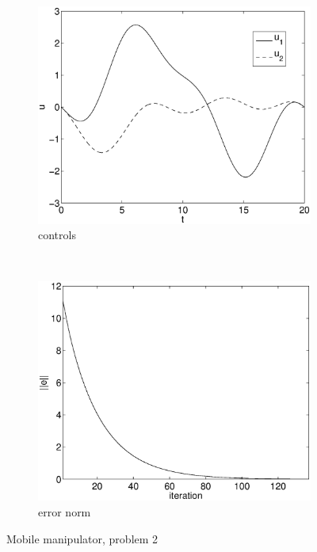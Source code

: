 \begin{figure}[h]
\begin{subfigure}[b]{0.45\textwidth}
\centering
\includegraphics[width=\textwidth]{img/manip_pltf_task_u.eps}
\caption{controls}
\end{subfigure}
~
\begin{subfigure}[b]{0.45\textwidth}
\centering
\includegraphics[width=\textwidth]{img/manip_pltf_task_err.eps}
\caption{error norm}
\end{subfigure}
\caption{Mobile manipulator, problem 2}
\label{fig:pr2}
\end{figure}
